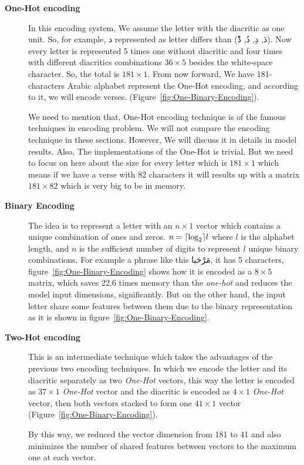 \begin{description}

\item[\textbf{One-Hot encoding}] In this encoding system, We assume the letter with the diacritic as one unit. So, for example, \textarabic{د} represented as letter differs than (\textarabic{دَ, دِ, دُ, دْْ}). Now every letter is represented 5 times one without diacritic and four times with different diacritics combinations $36 \times 5$ besides the white-space character. So, the total is $181 \times 1$. From now forward, We have 181-characters Arabic alphabet represent the One-Hot encoding, and according to it, we will encode verses. (Figure~\ref{fig:One-Binary-Encoding}).

We need to mention that, One-Hot encoding technique is of the famous techniques in encoding problem. We will not compare the encoding technique in these sections. However, We will discuss it in details in model results. Also, The implementations of the One-Hot is trivial. But we need to focus on here about the size for every letter which is $181 \times 1$ which means if we have a verse with 82 characters it will results up with a matrix $181 \times 82$ which is very big to be in memory.

\item[\textbf{Binary Encoding}] The idea is to represent a letter with an $n \times 1$ vector which contains a unique combination of ones and zeros.  $n =\ceil*{\log_2} l$ where $l$ is the alphabet length, and $n$ is the sufficient number of digits to represent $l$ unique binary combinations.  For example a phrase like this \textarabic{مَرْحَبا}, it has 5 characters, figure~\ref{fig:One-Binary-Encoding} shows how it is encoded as a $8 \times 5$ matrix, which saves 22.6 times memory than the \textit{one-hot} and reduces the model input dimensions, significantly. But on the other hand, the input letter share some features between them due to the binary representation as it is shown in figure~\ref{fig:One-Binary-Encoding}.

\item[\textbf{Two-Hot encoding}] This is an intermediate technique which takes the advantages of the previous two encoding techniques. In which we encode the letter and its diacritic separately as two \textit{One-Hot} vectors, this way the letter is encoded as $37 \times 1$ \textit{One-Hot} vector and the diacritic is encoded as $4 \times 1$ \textit{One-Hot} vector, then both vectors stacked to form one $41 \times 1$ vector (Figure~\ref{fig:One-Binary-Encoding}).

By this way, we reduced the vector dimension from 181 to 41 and also minimizes the number of shared features between vectors to the maximum one at each vector. 
\end{description}




